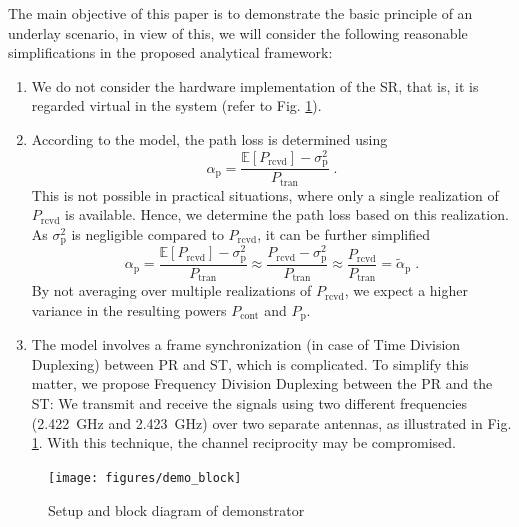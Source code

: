 The main objective of this paper is to demonstrate the basic principle of an underlay scenario, in view of this, we will consider the following reasonable simplifications in the proposed analytical framework:

\begin{enumerate}
	\item We do not consider the hardware implementation of the SR, that is, it is regarded virtual in the system (refer to Fig. \ref{demo_blockA}).
	\item According to the model, the path loss is determined using \cite{Kaushik15}	
	\begin{equation}
		\label{alphap}
		\alpha_\textrm{p} = \frac{\mathbb{E}\left[P_\textrm{rcvd}\right]-\sigma_\textrm{p}^2}{P_\textrm{tran}} \;  .
	\end{equation}	
	This is not possible in practical situations, where only a single realization of $P_\textrm{rcvd}$ is available. Hence, we determine the path loss based on this realization. As $\sigma_\textrm{p}^2$ is negligible compared to $P_\textrm{rcvd}$, it can be further simplified
	\begin{equation}
		\label{alphapschlange}
		\alpha_\textrm{p} = \frac{\mathbb{E}\left[P_\textrm{rcvd}\right]-\sigma_\textrm{p}^2}{P_\textrm{tran}} \approx \frac{P_\textrm{rcvd}-\sigma_\textrm{p}^2}{P_\textrm{tran}} \approx \frac{P_\textrm{rcvd}}{P_\textrm{tran}} = \widetilde\alpha_\textrm{p} \;  .
	\end{equation}
	By not averaging over multiple realizations of $P_\textrm{rcvd}$, we expect a higher variance in the resulting powers $P_\textrm{cont}$ and $P_\textrm{p}$.
	\item The model	involves a frame synchronization (in case of Time Division Duplexing) between PR and ST, which is complicated. To simplify this matter, we propose Frequency Division Duplexing between the PR and the ST: We transmit and receive the signals using two different frequencies (\SI{2.422}{GHz} and \SI{2.423}{GHz}) over two separate antennas, as illustrated in Fig. \ref{demo_blockA}. With this technique, the channel reciprocity may be compromised.	
\end{enumerate}

\begin{figure}
	\centering
	\texttt{[image: figures/demo\_block]}
	\caption{Setup and block diagram of demonstrator}
	\label{demo_blockA}
\end{figure}


